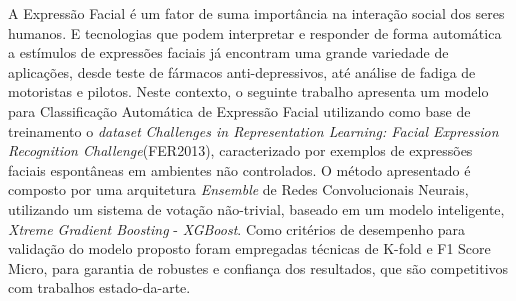 \begin{resumo}

A Expressão Facial é um fator de suma importância na interação social dos seres humanos. E tecnologias que podem interpretar e responder de forma automática a estímulos de expressões faciais já encontram uma grande variedade de aplicações, desde teste de fármacos anti-depressivos, até análise de fadiga de motoristas e pilotos. Neste contexto, o seguinte trabalho apresenta um modelo para Classificação Automática de Expressão Facial utilizando como base de treinamento o \textit{dataset} \textit{Challenges in Representation Learning: Facial Expression Recognition Challenge}(FER2013), caracterizado por exemplos de expressões faciais espontâneas em ambientes não controlados.  O método apresentado é composto por uma arquitetura \textit{Ensemble} de Redes Convolucionais Neurais, utilizando um sistema de votação não-trivial, baseado em um modelo inteligente, \textit{Xtreme Gradient Boosting} - \textit{XGBoost}. Como critérios de desempenho para validação do modelo proposto foram empregadas técnicas de K-fold e F1 Score Micro, para garantia de robustes e confiança dos resultados, que são competitivos com trabalhos estado-da-arte.

\end{resumo}
